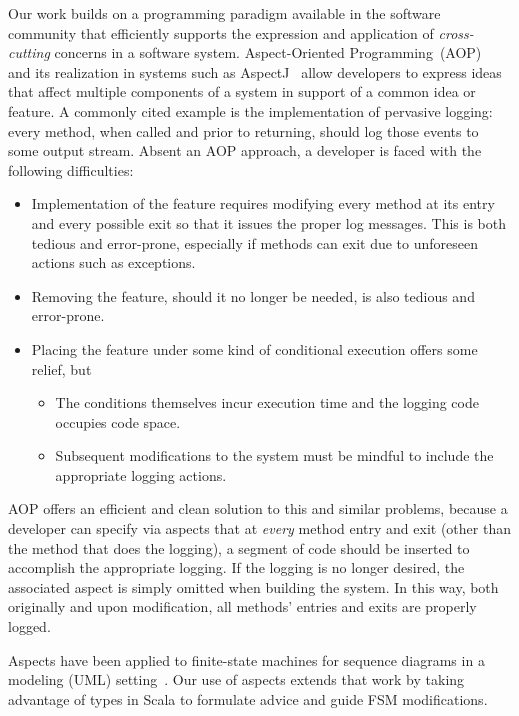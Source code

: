\documentclass[conference]{IEEEtran}
\begin{document}
Our work builds on a programming paradigm available in the software community that efficiently supports the expression and application of \emph{cross-cutting} concerns in a software system.  Aspect-Oriented Programming~(AOP)~\cite{gregor:97} and its realization in systems such as AspectJ~\cite{aspectj} allow developers to express ideas that affect multiple components of a system in support of a common idea or feature. A commonly cited example is the implementation of pervasive logging: every method, when called and prior to returning, should log those events to some output stream. Absent an AOP approach, a developer is faced with the following difficulties:
\begin{itemize}
    \item Implementation of the feature requires modifying every method at its entry and every possible exit so that it issues the proper log messages.  This is both tedious and error-prone, especially if methods can exit due to unforeseen actions such as exceptions.
    \item Removing the feature, should it no longer be needed, is also tedious and error-prone.
    \item Placing the feature under some kind of conditional execution offers some relief, but
    \begin{itemize}
        \item The conditions themselves incur execution time and the logging code occupies code space.
        \item Subsequent modifications to the system must be mindful to include the appropriate logging actions.
    \end{itemize}
\end{itemize}
AOP offers an efficient and clean solution to this and similar problems, because a developer can specify via aspects that at \emph{every} method entry and exit (other than the method that does the logging), a segment of code should be inserted to accomplish the appropriate logging.  If the logging is no longer desired, the associated aspect is simply omitted when building the system.  In this way, both originally and upon modification, all methods' entries and exits are properly logged.

Aspects have been applied to finite-state machines for sequence diagrams in a modeling (UML) setting~\cite{aspectsUML}.  Our use of aspects extends that work by taking advantage of types in Scala to formulate advice and guide FSM modifications. 
\end{document}
